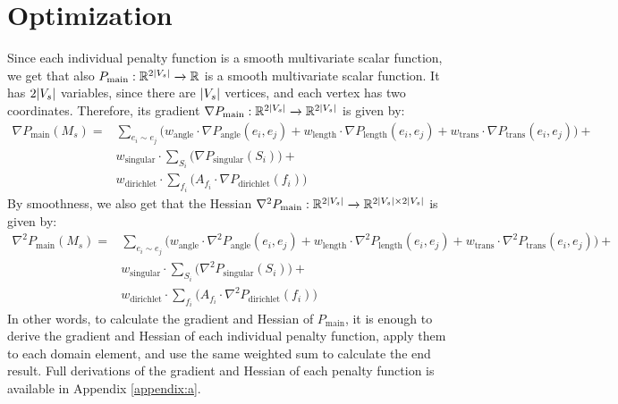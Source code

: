 \section{Optimization}
\label{section:optimization}
Since each individual penalty function is a smooth multivariate scalar function, we get that also $P_{\mathrm{main}}: \mathbb{R}^{2\lvert V_s\rvert} \xrightarrow[]{} \mathbb{R}$ is a smooth multivariate scalar function. It has $2\lvert V_s\rvert$ variables, since there are $\lvert V_s\rvert$ vertices, and each vertex has two coordinates. Therefore, its gradient $\nabla P_{\mathrm{main}}: \mathbb{R}^{2\lvert V_s\rvert} \xrightarrow[]{} \mathbb{R}^{2\lvert V_s\rvert}$ is given by:
\begin{equation}\label{eq:main_objective_function_gradient}
\begin{split}
\nabla P_{\mathrm{main}}\left(M_s\right) = &\sum_{e_i \sim e_j} \Big(w_{\mathrm{angle}} \cdot \nabla P_{\mathrm{angle}}\left(e_i,e_j\right) + w_{\mathrm{length}} \cdot \nabla P_{\mathrm{length}}\left(e_i,e_j\right) + w_{\mathrm{trans}} \cdot \nabla P_{\mathrm{trans}}\left(e_i,e_j\right)\Big) + \\
&w_{\mathrm{singular}} \cdot \sum_{S_i} \Big(\nabla P_{\mathrm{singular}}\left(S_i\right)\Big) +
\\
&w_{\mathrm{dirichlet}} \cdot \sum_{f_i} \Big(A_{f_i} \cdot \nabla P_{\mathrm{dirichlet}}\left(f_i\right)\Big)
\end{split}
\end{equation}
By smoothness, we also get that the Hessian $\nabla^2 P_{\mathrm{main}}: \mathbb{R}^{2\lvert V_s\rvert} \xrightarrow[]{} \mathbb{R}^{2\lvert V_s\rvert \times 2\lvert V_s\rvert}$ is given by:
\begin{equation}\label{eq:main_objective_function_gradient}
\begin{split}
\nabla^2 P_{\mathrm{main}}\left(M_s\right) = &\sum_{e_i \sim e_j} \Big(w_{\mathrm{angle}} \cdot \nabla^2 P_{\mathrm{angle}}\left(e_i,e_j\right) + w_{\mathrm{length}} \cdot \nabla^2 P_{\mathrm{length}}\left(e_i,e_j\right) + w_{\mathrm{trans}} \cdot \nabla^2 P_{\mathrm{trans}}\left(e_i,e_j\right)\Big) + \\
&w_{\mathrm{singular}} \cdot \sum_{S_i} \Big(\nabla^2 P_{\mathrm{singular}}\left(S_i\right)\Big) +
\\
&w_{\mathrm{dirichlet}} \cdot \sum_{f_i} \Big(A_{f_i} \cdot \nabla^2 P_{\mathrm{dirichlet}}\left(f_i\right)\Big)
\end{split}
\end{equation}
In other words, to calculate the gradient and Hessian of $P_{\mathrm{main}}$, it is enough to derive the gradient and Hessian of each individual penalty function, apply them to each domain element, and use the same weighted sum to calculate the end result. Full derivations of the gradient and Hessian of each penalty function is available in Appendix \ref{appendix:a}.

